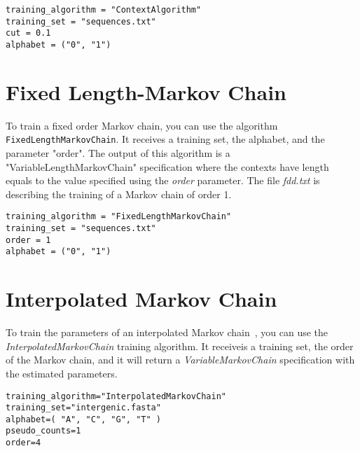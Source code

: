 \vspace{1em}
\begin{minipage}{\textwidth}
\begin{Verbatim}[frame=single,  label={bic.txt}]
training_algorithm = "ContextAlgorithm"
training_set = "sequences.txt"
cut = 0.1
alphabet = ("0", "1")
\end{Verbatim}
\end{minipage}
\vspace{1em}



\section{Fixed Length-Markov Chain}

To train a fixed order Markov chain, you can use the algorithm \texttt{FixedLengthMarkovChain}. It receives a training set, the alphabet, and the parameter "order". The output of this algorithm is a "VariableLengthMarkovChain" specification where the contexts have length equals to the value specified using the \textit{order} parameter. The file  \textit{fdd.txt} is describing the training of a Markov chain of order 1.
 
\vspace{1em}
\begin{minipage}{\textwidth}
\begin{Verbatim}[frame=single,  label={fdd.txt}]
training_algorithm = "FixedLengthMarkovChain"
training_set = "sequences.txt"
order = 1
alphabet = ("0", "1")
\end{Verbatim}
\end{minipage}
\vspace{1em}


\section{Interpolated Markov Chain}

To train the parameters of an interpolated Markov chain~\cite{Salzberg1998}, you can use the \textit{InterpolatedMarkovChain} training algorithm. It receiveis a training set, the order of the Markov chain, and it will return a \textit{VariableMarkovChain} specification with the estimated parameters.

\begin{Verbatim}[frame=single,label=train.txt]
training_algorithm="InterpolatedMarkovChain"
training_set="intergenic.fasta"
alphabet=( "A", "C", "G", "T" )
pseudo_counts=1
order=4
\end{Verbatim}




